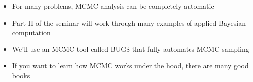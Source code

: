 \documentclass{beamer}
\begin{document}
\begin{frame}
  \begin{itemize}
    \item{For many problems, MCMC analysis can be completely automatic}
    \item{Part II of the seminar will work through many examples of applied Bayesian computation}
    \item{We'll use an MCMC tool called BUGS that fully automates MCMC sampling}
    \item{If you want to learn how MCMC works under the hood, there are many good books}
  \end{itemize}
\end{frame}
\end{document}
